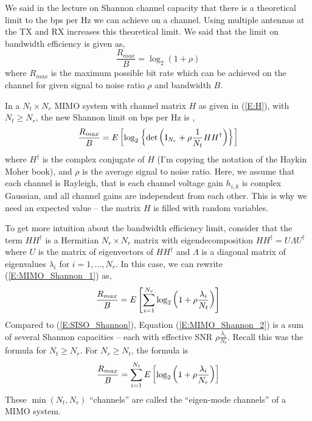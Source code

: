 We said in the lecture on Shannon channel capacity  that there is a theoretical limit to the bps per Hz we can achieve on a channel.  Using multiple antennas at the TX and RX increases this theoretical limit.  We said that the limit on bandwidth efficiency is given as,
\begin{equation} \label{E:SISO_Shannon}
 \frac{R_{max}}{B} =  \log_2 \left( 1 + \rho \right)
\end{equation}
where $R_{max}$ is the maximum possible bit rate which can be achieved on the channel for given signal to noise ratio $\rho$ and bandwidth $B$.

In a $N_t \times N_r$ MIMO system with channel matrix $H$ as given in (\ref{E:H}), with $N_t \ge N_r$, the new Shannon limit on bps per Hz is \cite{haykin2005modern},
\begin{equation} \label{E:MIMO_Shannon_1}
 \frac{R_{max}}{B} =  E_{}\left[ {\log_2 \left\{ \mbox{det} \left( \mathrm{I}_{N_r} + \rho\frac{1}{N_t} HH^\dagger \right) \right\} } \right]
\end{equation}
where $H^\dagger$ is the complex conjugate of $H$ (I'm copying the notation of the Haykin Moher book), and $\rho$ is the average signal to noise ratio.  Here, we assume that each channel is Rayleigh, that is each channel voltage gain $h_{i,k}$ is complex Gaussian, and all channel gains are independent from each other.  This is why we need an expected value -- the matrix $H$ is filled with random variables. 

To get more intuition about the bandwidth efficiency limit, consider that the term $HH^\dagger$ 
is a Hermitian $N_r \times N_r$ matrix 
with eigendecomposition $H H^\dagger = U \Lambda U^\dagger$ 
where $U$ is the matrix of eigenvectors of $H H^\dagger$ and $\Lambda$ is a diagonal matrix of eigenvalues $\lambda_i$ for $i=1, \ldots, N_r$.  In this case, we can rewrite (\ref{E:MIMO_Shannon_1}) as,
\begin{equation} \label{E:MIMO_Shannon_2}
 \frac{R_{max}}{B} =  E_{}\left[ {\sum_{i=1}^{N_r} \log_2 \left( 1 + \rho \frac{\lambda_i}{N_t} \right)  } \right]
\end{equation}
Compared to (\ref{E:SISO_Shannon}), Equation (\ref{E:MIMO_Shannon_2}) is a sum of several Shannon capacities -- each with effective SNR $\rho\frac{\lambda_i}{N_t}$.  Recall this was the formula for $N_t \ge N_r$.  For $N_r \ge N_t$, the formula is
\begin{equation} \label{E:MIMO_Shannon_3}
 \frac{R_{max}}{B} =  \sum_{i=1}^{N_t} E_{}\left[ { \log_2 \left( 1 + \rho\frac{\lambda_i}{N_r} \right)  } \right]
\end{equation}
These $\min (N_t, N_r)$ ``channels'' are called the ``eigen-mode channels'' of a MIMO system.

